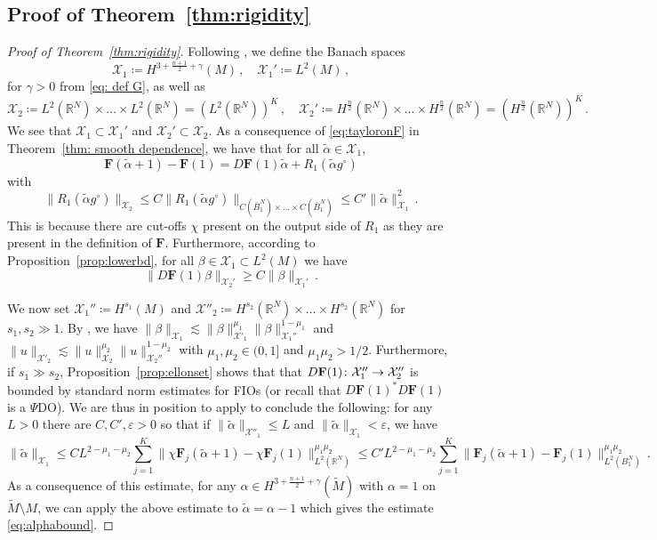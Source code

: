 \documentclass[11pt]{amsart}
\theoremstyle{definition}
\numberwithin{equation}{section}
\newcommand{\mR}{\mathbb{R}}                    %
\newcommand{\norm}[1]{\lVert #1 \rVert}         %
\newcommand{\eps}{\varepsilon}
\begin{document}
\subsection{Proof of Theorem~\ref{thm:rigidity}}

\begin{proof}[Proof of Theorem~\ref{thm:rigidity}]
	Following \cite[Thm.~2]{stefanov2009linearizing}, we define the Banach spaces
	\[
	\mathcal{X}_1 \coloneqq H^{3+\frac{n+1}{2}+\gamma}(M)\,,\quad \mathcal{X}_1' \coloneqq L^2(M)\,,
	\]
	for $\gamma>0$ from \eqref{eq: def G}, as well as
	\[
	\mathcal{X}_2 \coloneqq L^2(\mR^{N})\times\dots\times L^2(\mR^{N}) = (L^2(\mR^{N}))^K\,,\quad \mathcal{X}_2' \coloneqq H^{\frac{n}{2}}(\mR^{N})\times\dots\times H^{\frac{n}{2}}(\mR^{N}) = (H^{\frac{n}{2}}(\mR^{N}))^K\,.
	\]
	We see that $\mathcal{X}_1 \subset \mathcal{X}_1'$ and $\mathcal{X}_2'\subset \mathcal{X}_2$. 
	As a consequence of \eqref{eq:tayloronF} in Theorem~\ref{thm: smooth dependence}, we have that for all $\tilde\alpha \in {\mathcal X}_1$,
	\[\mathbf{F}(\tilde{\alpha}+1) - \mathbf{F}(1) = D\mathbf{F}(1)\tilde{\alpha} +R_1(\tilde{\alpha}g^\circ) %
	\]
	with
	\[
		\norm{R_1(\tilde{\alpha}g^\circ)}_{\mathcal{X}_2} \leq C\norm{R_1(\tilde{\alpha}g^\circ)}_{C(\bar{B}_1^{N})\times\dots\times C(\bar{B}_1^{N})} \leq C'\norm{\tilde{\alpha}}_{\mathcal{X}_1}^2\,.
	\]
	This is because there are cut-offs $\chi$ present on the output side of $R_1$ as they are present in the definition of $\mathbf{F}$. Furthermore, according to Proposition~\ref{prop:lowerbd}, for all $\beta \in \mathcal{X}_1\subset L^2(M)$ we have
	\[
		\norm{D\mathbf{F}(1)\beta}_{\mathcal{X}_2'} \geq C\norm{\beta}_{\mathcal{X}_1'}\,.
	\]
	
	
    We now set ${\mathcal X}_1'' \coloneqq  H^{s_1}(M)$ and ${\mathcal X}''_2  \coloneqq H^{s_2}(\mR^{N})\times\dots\times H^{s_2}(\mR^{N})$ for $s_1, s_2\gg 1$. By \cite{MR0500580}, we have $\|\beta\|_{{\mathcal X}_1} \lesssim \|\beta\|_{{\mathcal X}'_1}^{\mu_1} \|\beta\|_{{\mathcal X}_1''}^{1-\mu_1}$ and $\|u\|_{{\mathcal X}'_2} \lesssim \|u\|_{{\mathcal X}_2}^{\mu_2} \|u\|_{{\mathcal X}_2''}^{1-\mu_2}$ with $\mu_1, \mu_2 \in (0,1]$ and $\mu_1\mu_2>1/2$. Furthermore, if $s_1\gg s_2$, Proposition~\ref{prop:ellonset} shows that that $D{\bf F}(1)\colon {\mathcal X}''_1 \to {\mathcal X}''_2$ is bounded by standard norm estimates for FIOs (or recall that $D\mathbf{F}(1)^\ast D\mathbf{F}(1)$ is a $\Psi$DO). %
We are thus in position to apply \cite[Thm.~2]{stefanov2009linearizing}
to conclude the following: for any $L>0$ there are $C,C',\eps >0$ so that if $\norm{\tilde{\alpha}}_{{\mathcal X}''_1} \leq L$ and $\norm{\tilde{\alpha}}_{\mathcal{X}_1}<\eps$, we have
	\[
		\norm{\tilde{\alpha}}_{\mathcal{X}_1} \leq  CL^{2-\mu_1-\mu_2}\sum_{j=1}^K\norm{\chi\mathbf{F}_j(\tilde{\alpha}+1)-\chi\mathbf{F}_j(1)}_{L^2(\mR^{N})}^{\mu_1\mu_2} \leq C' L^{2-\mu_1-\mu_2}\sum_{j=1}^K\norm{\mathbf{F}_j(\tilde{\alpha}+1)-\mathbf{F}_j(1)}_{L^2(B_1^{N})}^{\mu_1\mu_2}\,.
	\]
	As a consequence of this estimate, for any $\alpha \in H^{3+\frac{n+1}{2}+\gamma}(\widetilde{M})$ with $\alpha = 1$ on $\widetilde{M} \setminus M$, we can apply the above estimate to $\tilde{\alpha}=\alpha-1$ which gives the estimate \eqref{eq:alphabound}.%
\end{proof}
\end{document}
